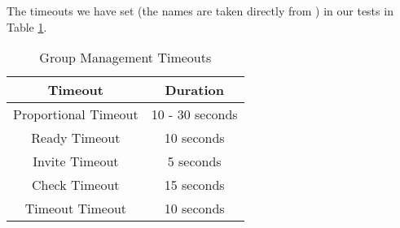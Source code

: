   The timeouts we have set (the 
names are taken directly from \cite{INVITATIONELECTION}) in our tests in Table 
\ref{Table:Timeouts}.


\begin{table}
\caption{Group Management Timeouts}
\label{Table:Timeouts}
\centering
\begin{tabular}{ c c }
\hline
Timeout & Duration \\ \hline \hline
Proportional Timeout & 10 - 30 seconds \\ \hline
Ready Timeout & 10 seconds \\ \hline
Invite Timeout & 5 seconds \\ \hline
Check Timeout & 15 seconds \\ \hline
Timeout Timeout & 10 seconds \\ \hline
\end{tabular}
\end{table}


